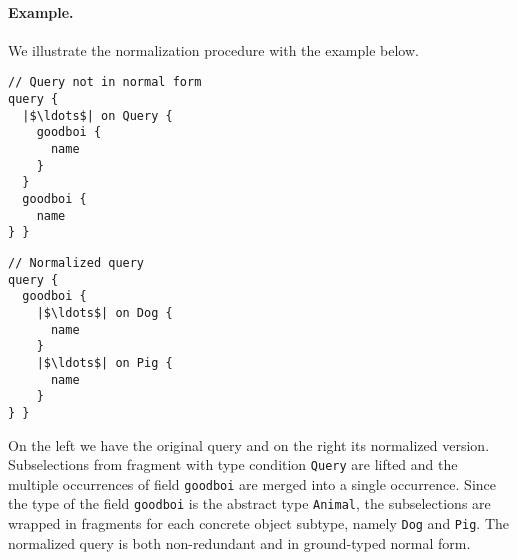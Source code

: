 \paragraph{Example.}  We illustrate the normalization procedure with
the example below.

\smallskip

\begin{minipage}[t]{.25\textwidth}
\begin{verbatim}
// Query not in normal form
query {
  |$\ldots$| on Query {
    goodboi {
      name
    }
  }
  goodboi {
    name
} }
\end{verbatim}
\end{minipage}%
\begin{minipage}[t]{.25\textwidth}
\begin{verbatim}
// Normalized query
query {
  goodboi {
    |$\ldots$| on Dog {
      name
    }
    |$\ldots$| on Pig {
      name
    }
} }
\end{verbatim} 
\end{minipage}

\medskip

\noindent On the left we have the original query and on the right its normalized
version. Subselections from fragment with type condition \texttt{Query} are lifted and the multiple occurrences of field \texttt{goodboi} are merged into a single occurrence. 
Since the type of the field \texttt{goodboi} is the abstract type \texttt{Animal}, the subselections are wrapped in fragments for each concrete object subtype, namely \texttt{Dog} and \texttt{Pig}. The normalized query is both non-redundant and in ground-typed normal form. 




\iffalse
\begin{minipage}[t]{.25\textwidth}
\begin{verbatim}
// Redundant query
query {
    goodboi {
        name
    }
    goodboi { 
 	name
    } 
}
\end{verbatim}
\end{minipage}%
\begin{minipage}[t]{.25\textwidth}
\begin{verbatim}

// Normalized query
query {
    goodboi {
        |$\ldots$| on Dog {
	    name
	}
	|$\ldots$| on Pig {
	    name
	}
    }	
}
\end{verbatim} 
\end{minipage}
\fi

